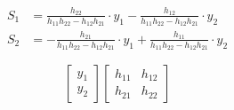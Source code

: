 \documentclass{ltjsarticle}
\begin{document}
\begin{align*}
  S_1 &= \frac{h_{22}}{h_{11}h_{22} - h_{12}h_{21}} \cdot y_1 - \frac{h_{12}}{h_{11}h_{22} - h_{12}h_{21}} \cdot y_2\\
  S_2 &= - \frac{h_{21}}{h_{11}h_{22} - h_{12}h_{21}} \cdot y_1 + \frac{h_{11}}{h_{11}h_{22} - h_{12}h_{21}} \cdot y_2
\end{align*}

\begin{equation*}
  \begin{bmatrix*}
    y_1 \\ y_2
  \end{bmatrix*}

  \begin{bmatrix*}
    h_{11} & h_{12} \\
    h_{21} & h_{22}
  \end{bmatrix*}

\end{equation*}
\end{document}
